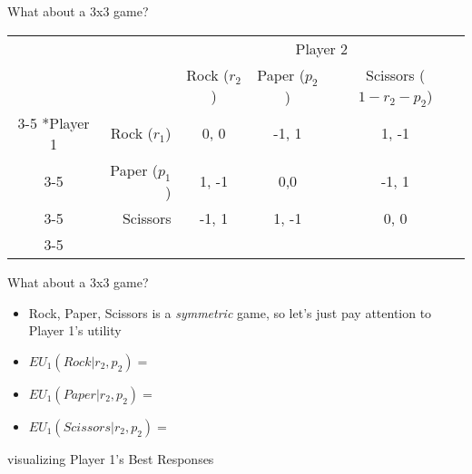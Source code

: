 
\begin{frame}{What about a 3x3 game?}
\begin{table}[h]
\centering
  \begin{tabular}{cr|c|c|c|}
	& \multicolumn{1}{c}{} & \multicolumn{3}{c}{Player 2}\\
    & \multicolumn{1}{c}{} & Rock ($r_2$) & Paper ($p_2$) & Scissors ($1-r_2-p_2$) \\\cline{3-5}
    \multirow{3}*{Player 1}  & Rock ($r_1$) & 0, 0 & -1, 1 & 1, -1 \\\cline{3-5}
    & Paper ($p_1$) & 1, -1 & 0,0 & -1, 1 \\\cline{3-5}
    & Scissors  & -1, 1 & 1, -1 & 0, 0 \\\cline{3-5}
\end{tabular}
\end{table}
\end{frame}


\begin{frame}{What about a 3x3 game?}
  \begin{itemize}
    \item Rock, Paper, Scissors is a \textit{symmetric} game, so let's just pay attention to Player 1's utility 

    \item $EU_1(Rock | r_2, p_2) = $

    \item $EU_1(Paper | r_2, p_2) = $

    \item $EU_1(Scissors | r_2, p_2) = $
  \end{itemize}
  
\end{frame}

\begin{frame}{visualizing Player 1's Best Responses}
  \begin{center}
  \end{center}
\end{frame}

